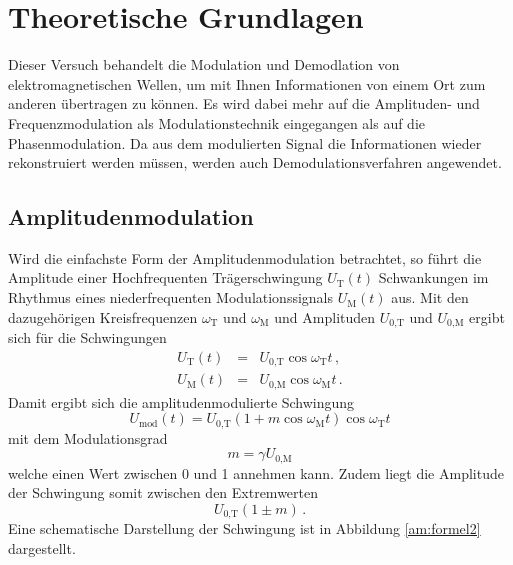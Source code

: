 \section{Theoretische Grundlagen}
\label{sec:theorie}

Dieser Versuch behandelt die Modulation und Demodlation von elektromagnetischen Wellen, um mit Ihnen Informationen von einem Ort
zum anderen übertragen zu können.
Es wird dabei mehr auf die Amplituden- und Frequenzmodulation als Modulationstechnik eingegangen als auf die Phasenmodulation.
Da aus dem modulierten Signal die Informationen wieder rekonstruiert werden müssen, werden auch Demodulationsverfahren angewendet.

\subsection{Amplitudenmodulation}
\label{subsec:klassisch}

Wird die einfachste Form der Amplitudenmodulation betrachtet, so führt die Amplitude einer Hochfrequenten Trägerschwingung $U_\text{T}(t)$ Schwankungen im Rhythmus eines niederfrequenten Modulationssignals $U_\text{M}(t)$ aus.
Mit den dazugehörigen Kreisfrequenzen $\omega_\text{T}$ und $\omega_\text{M}$ und Amplituden $U_\text{0,T}$ und $U_\text{0,M}$ ergibt sich für die Schwingungen
\begin{eqnarray*}
    U_\text{T}(t) &=& U_\text{0,T} \cos{\omega_\text{T} t}\, , \\
    U_\text{M}(t) &=& U_\text{0,M} \cos{\omega_\text{M} t}\, .
\end{eqnarray*}
Damit ergibt sich die amplitudenmodulierte Schwingung 
\begin{equation}
    U_\text{mod}(t) = U_\text{0,T} ( 1 + m \cos{\omega_\text{M} t} ) \cos{\omega_\text{T} t} \label{am:formel1}
\end{equation}
mit dem Modulationsgrad
\begin{equation}
    m = \gamma U_\text{0,M}
\end{equation}
welche einen Wert zwischen 0 und 1 annehmen kann.
Zudem liegt die Amplitude der Schwingung somit zwischen den Extremwerten
\begin{equation}
    U_\text{0,T} (1 \pm m)\,.
\end{equation}
Eine schematische Darstellung der Schwingung ist in Abbildung \ref{am:formel2} dargestellt.

